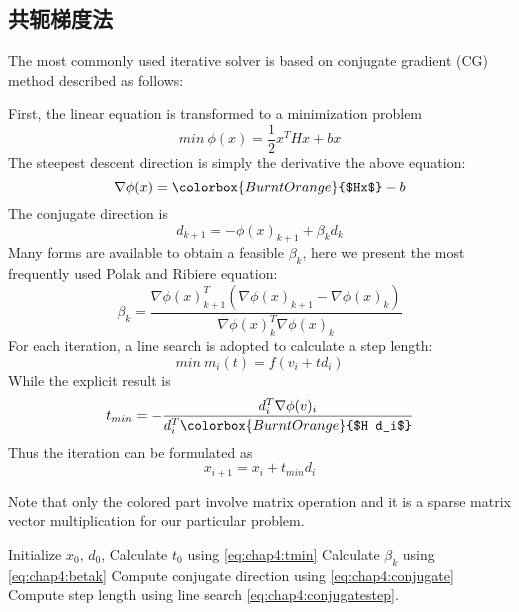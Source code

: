 \subsection{共轭梯度法}
The most commonly used iterative solver is based on conjugate gradient (CG) method described as follows:

First, the linear equation is transformed to a minimization problem
\begin{equation}
min\:\phi(x)=\frac{1}{2}x^THx+bx
\end{equation}
The steepest descent direction is simply the derivative the above equation:
\begin{equation}
\nabla \phi(x)=\colorbox{BurntOrange}{$Hx$}-b
\end{equation}
The conjugate direction is
\begin{equation}\label{eq:chap4:conjugate}
d_{k+1}=-\phi(x)_{k+1}+\beta_k d_k
\end{equation}
Many forms are available to obtain a feasible $\beta_k$, here we present the most frequently used Polak and Ribiere equation\parencite{dai1999nonlinear}:
\begin{equation}\label{eq:chap4:betak}
\beta_k=\frac{\nabla \phi(x)_{k+1}^T(\nabla \phi(x)_{k+1}-\nabla \phi(x)_k)}{\nabla \phi(x)_k^T\nabla \phi(x)_k}
\end{equation}
For each iteration, a line search is adopted to calculate a step length:
\begin{equation}\label{eq:chap4:conjugatestep}
min \: m_i(t)=f(v_i+td_i)
\end{equation}
While the explicit result is 
\begin{equation}\label{eq:chap4:tmin}
t_{min}=-\frac{d_i^T \nabla \phi(v)_i}{d_i^T \colorbox{BurntOrange}{$H d_i$}}
\end{equation}
Thus the iteration can be formulated as 
\begin{equation}
x_{i+1}=x_{i}+t_{min}d_i
\end{equation}

Note that only the colored part involve matrix operation and it is a sparse matrix vector multiplication for our particular problem. 
\begin{center}
	\label{algo:sum_I_want}
	\begin{algorithmic}[1]
		\STATE Initialize $x_0$, $d_0$, 
		\STATE Calculate $t_0$ using \eqref{eq:chap4:tmin}
		\STATE Calculate $\beta_k$ using \eqref{eq:chap4:betak}
		\STATE Compute conjugate direction using \eqref{eq:chap4:conjugate}
		\STATE Compute step length using line search \eqref{eq:chap4:conjugatestep}.
		\ENDFOR
	\end{algorithmic}
	\vspace{-5pt}\hrulefill
\end{center}
